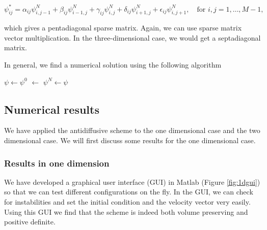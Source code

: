 \documentclass[10pt, a4paper]{article}
\begin{document}
\begin{equation*}
\psi_{ij}^* = \alpha_{ij} \psi_{i,j-1}^N + \beta_{ij} \psi_{i-1,j}^N +\gamma_{ij} \psi_{i,j}^N +\delta_{ij} \psi_{i+1,j}^N + \epsilon_{ij} \psi_{i,j+1}^N, \quad \text{for } i,j=1,\ldots,M-1,
\end{equation*}

which gives a pentadiagonal sparse matrix. Again, we can use sparse matrix vector multiplication. In the three-dimensional case, we would get a septadiagonal matrix.

In general, we find a numerical solution using the following algorithm

\IncMargin{1em}
\begin{algorithm}[H]
\BlankLine
$\psi \leftarrow \psi^0$\;
\Mone $\leftarrow$ \;
$\psi^N \leftarrow \psi$\;
\end{algorithm}
\DecMargin{1em}





\subsection{Numerical results}
We have applied the antidiffusive scheme to the one dimensional case and the two dimensional case. We will first discuss some results for the one dimensional case.


\subsubsection{Results in one dimension}
We have developed a graphical user interface (GUI) in Matlab (Figure \ref{fig:1dgui}) so that we can test different configurations on the fly. In the GUI, we can check for instabilities and set the initial condition and the velocity vector very easily. Using this GUI we find that the scheme is indeed both volume preserving and positive definite. 
\end{document}
